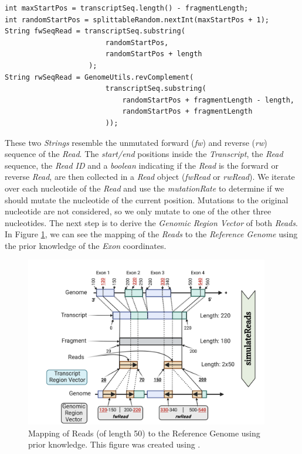 \documentclass[12pt]{article}
\begin{document}
\begin{enumerate}
\begin{verbatim}
int maxStartPos = transcriptSeq.length() - fragmentLength;
int randomStartPos = splittableRandom.nextInt(maxStartPos + 1);
String fwSeqRead = transcriptSeq.substring(
                        randomStartPos, 
                        randomStartPos + length
                    );
String rwSeqRead = GenomeUtils.revComplement(
                        transcriptSeq.substring(
                            randomStartPos + fragmentLength - length, 
                            randomStartPos + fragmentLength
                        ));
       \end{verbatim}
		These two \textit{Strings} resemble the unmutated forward (\textit{fw}) and reverse (\textit{rw}) sequence of the \textit{Read}.
		The \textit{start/end} positions inside the \textit{Transcript}, the \textit{Read} sequence, the \textit{Read ID} and a \textit{boolean} indicating if the \textit{Read}
		is the forward or reverse \textit{Read}, are then collected in a \textit{Read} object (\textit{fwRead} or \textit{rwRead}).
		We iterate over each nucleotide of the \textit{Read} and use the \textit{mutationRate} to determine if we should mutate the nucleotide of the
		current position.
		Mutations to the original nucleotide are not considered, so we only mutate to one of the other three nucleotides.
		The next step is to derive the \textit{Genomic Region Vector} of both \textit{Reads}.
		In Figure \ref{fig:mapping}, we can see the mapping of the \textit{Reads} to the \textit{Reference Genome} using the prior knowledge of the \textit{Exon} coordinates.

		\begin{figure}[htpb]
			\centering
			\includegraphics[width=0.95\textwidth]{"./figures/Map.png"}
			\caption{Mapping of Reads (of length 50) to the Reference Genome using prior knowledge. This figure was created using \cite{biorender}.}
			\label{fig:mapping}
		\end{figure}


\end{enumerate}
\end{document}
